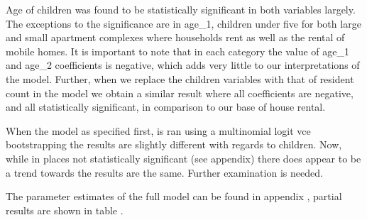 \documentclass{article}
\begin{document}
Age of children was found to be statistically significant in both variables largely.  The exceptions to the significance are in age_1, children under five for both large and small apartment complexes where households rent as well as the rental of mobile homes.  It is important to note that in each category the value of age_1 and age_2 coefficients is negative, which adds very little to our interpretations of the model.  Further, when we replace the children variables with that of resident count in the model we obtain a similar result where all coefficients are negative, and all statistically significant, in comparison to our base of house rental. 

When the model as specified first, is ran using a multinomial logit vce bootstrapping the results are slightly different with regards to children.  Now, while in places not statistically significant (see appendix) there does appear to be a trend towards the results are the same.  Further examination is needed.

The parameter estimates of the full model can be found in appendix 
, partial results are shown in table 
.
  
\end{document}
